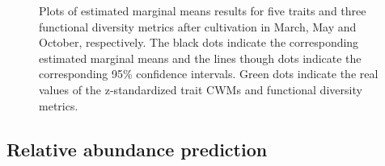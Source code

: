 \documentclass[a4paper, 11, margin=2cm]{article}
\begin{document}
      \begin{figure}[H]
        \centering
        \caption{Plots of estimated marginal means results for five traits and three functional diversity metrics after cultivation in March, May and October, respectively. The black dots indicate the corresponding estimated marginal means and the lines though dots indicate the corresponding 95\% confidence intervals. Green dots indicate the real values of the z-standardized trait CWMs and functional diversity metrics.}
      \end{figure}
      

      \subsection{Relative abundance prediction}
 
\end{document}
